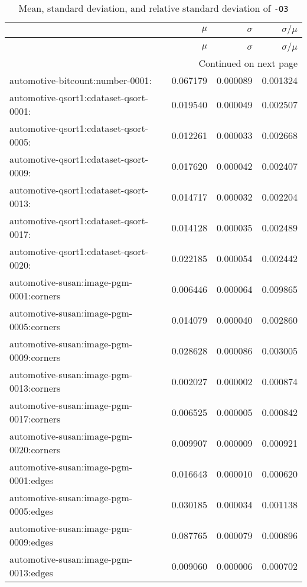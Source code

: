 \begin{longtable}{lrrr}
\caption{Mean, standard deviation, and relative standard deviation of \texttt{-O3}} \label{table:default-relative-standard-deviation} \\
\toprule
 & $\mu$ & $\sigma$ & $\sigma / \mu$ \\
\midrule
\endfirsthead
\caption[]{Mean, standard deviation, and relative standard deviation of \texttt{-O3}} \\
\toprule
 & $\mu$ & $\sigma$ & $\sigma / \mu$ \\
\midrule
\endhead
\midrule
\multicolumn{4}{r}{Continued on next page} \\
\midrule
\endfoot
\bottomrule
\endlastfoot
automotive-bitcount:number-0001: & 0.067179 & 0.000089 & 0.001324 \\
automotive-qsort1:cdataset-qsort-0001: & 0.019540 & 0.000049 & 0.002507 \\
automotive-qsort1:cdataset-qsort-0005: & 0.012261 & 0.000033 & 0.002668 \\
automotive-qsort1:cdataset-qsort-0009: & 0.017620 & 0.000042 & 0.002407 \\
automotive-qsort1:cdataset-qsort-0013: & 0.014717 & 0.000032 & 0.002204 \\
automotive-qsort1:cdataset-qsort-0017: & 0.014128 & 0.000035 & 0.002489 \\
automotive-qsort1:cdataset-qsort-0020: & 0.022185 & 0.000054 & 0.002442 \\
automotive-susan:image-pgm-0001:corners & 0.006446 & 0.000064 & 0.009865 \\
automotive-susan:image-pgm-0005:corners & 0.014079 & 0.000040 & 0.002860 \\
automotive-susan:image-pgm-0009:corners & 0.028628 & 0.000086 & 0.003005 \\
automotive-susan:image-pgm-0013:corners & 0.002027 & 0.000002 & 0.000874 \\
automotive-susan:image-pgm-0017:corners & 0.006525 & 0.000005 & 0.000842 \\
automotive-susan:image-pgm-0020:corners & 0.009907 & 0.000009 & 0.000921 \\
automotive-susan:image-pgm-0001:edges & 0.016643 & 0.000010 & 0.000620 \\
automotive-susan:image-pgm-0005:edges & 0.030185 & 0.000034 & 0.001138 \\
automotive-susan:image-pgm-0009:edges & 0.087765 & 0.000079 & 0.000896 \\
automotive-susan:image-pgm-0013:edges & 0.009060 & 0.000006 & 0.000702 \\

\end{longtable}

